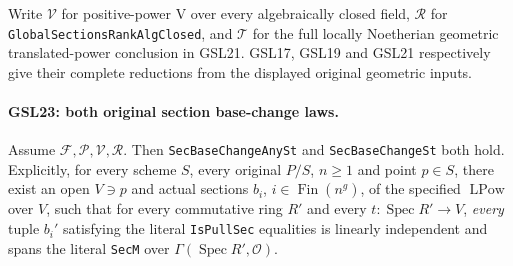 Write $\mathcal V$ for positive-power $\mathrm V$ over every
algebraically closed field, $\mathcal R$ for
\texttt{GlobalSections\allowbreak RankAlgClosed}, and $\mathcal T$ for the
full locally Noetherian geometric translated-power conclusion in
GSL21.  GSL17, GSL19 and GSL21 respectively give their complete
reductions from the displayed original geometric inputs.

\paragraph{GSL23: both original section base-change laws.}
\label{claim:GSL23}
Assume $\mathcal F,\mathcal P,\mathcal V,\mathcal R$.
Then \texttt{SecBaseChangeAnySt} and \texttt{SecBaseChangeSt} both
hold.  Explicitly, for every scheme $S$, every original $P/S$,
$n\ge1$ and point $p\in S$, there exist an open $V\ni p$
and actual sections $b_i$, $i\in\operatorname{Fin}(n^g)$,
of the specified $\operatorname{LPow}$ over $V$, such that
for every commutative ring $R'$ and every
$t:\operatorname{Spec}R'\to V$, \emph{every} tuple $b_i'$
satisfying the literal \texttt{IsPullSec} equalities is
linearly independent and spans the literal \texttt{SecM}
over $\Gamma(\operatorname{Spec}R',\mathcal O)$.

